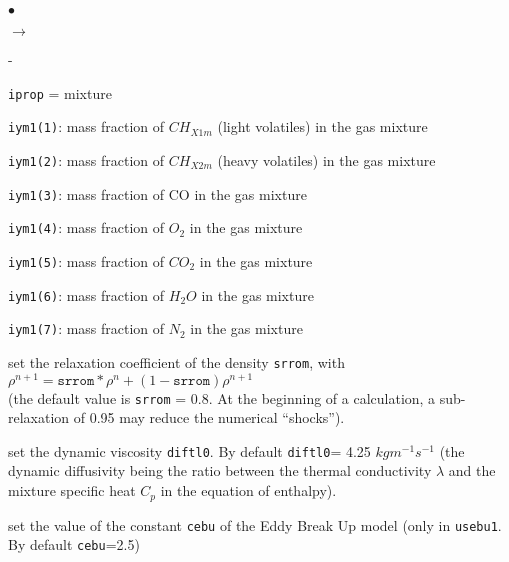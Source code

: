 {{\begin{list}{$\bullet$}{}
\begin{list}{$\rightarrow$}{}
\begin{list}{}{}
\begin{list}{-}{}
\begin{list}{\texttt{iprop} = }{}
                            mixture
                      \item \texttt{iym1(1)}: mass fraction of
                            $CH_{X1m}$ (light volatiles) in the gas
                            mixture
                      \item \texttt{iym1(2)}: mass fraction of
                            $CH_{X2m}$ (heavy volatiles) in the gas
                            mixture
                      \item \texttt{iym1(3)}: mass fraction of
                            CO in the gas mixture
                      \item \texttt{iym1(4)}: mass fraction of
                            $O_2$ in the gas mixture
                      \item \texttt{iym1(5)}: mass fraction of
                            $CO_2$ in the gas mixture
                      \item \texttt{iym1(6)}: mass fraction of
                            $H_2O$ in the gas mixture
                      \item \texttt{iym1(7)}: mass fraction of
                            $N_2$ in the gas mixture
                     \end{list}
              \end{list}
             \end{list}
      \end{list}

 \item set the relaxation coefficient of the density \texttt{srrom}, with \\
$\rho^{n+1}=\texttt{srrom}*\rho^{n}+(1-\texttt{srrom})\rho^{n+1}$\\
(the default value is \texttt{srrom} = 0.8. At the
      beginning of a calculation, a sub-relaxation of 0.95 may reduce
      the numerical ``shocks'').

 \item set the dynamic viscosity \texttt{diftl0}. By default
      \texttt{diftl0}= 4.25 $kgm^{-1}s^{-1}$
(the dynamic diffusivity being the ratio between the thermal
      conductivity $\lambda$ and the mixture specific heat $C_p$ in the
      equation of enthalpy).

 \item set the value of the constant \texttt{cebu} of the Eddy Break
      Up model (only in \texttt{usebu1}. By default \texttt{cebu}=2.5)
\end{list}

}}
